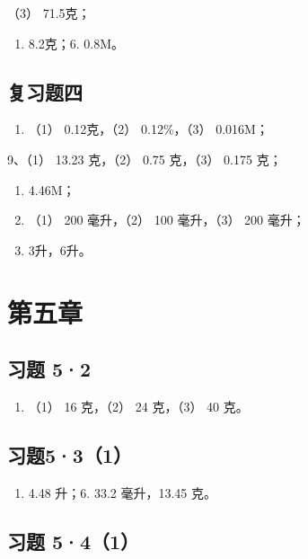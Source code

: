 （3） 71.5克；

\begin{enumerate}[start=4]
\item
  8.2克；6. 0.8M。
\end{enumerate}

\subsection{复习题四}

\begin{enumerate}[start=8]
\item
  （1） 0.12克，（2） 0.12\%，（3） 0.016M；
\end{enumerate}

9、（1） 13.23 克，（2） 0.75 克，（3） 0.175 克；

\begin{enumerate}[start=10]
\item
  4.46M；
\item
  （1） 200 毫升，（2） 100 毫升，（3） 200 毫升；
\item
  3升，6升。
\end{enumerate}

\section{第五章}

\subsection{习题 5·2}

\begin{enumerate}[start=7]
\item
  （1） 16 克，（2） 24 克，（3） 40 克。
\end{enumerate}

\subsection{习题5·3（1）}

\begin{enumerate}[start=5]
\item
  4.48 升；6. 33.2 毫升，13.45 克。
\end{enumerate}

\subsection{习题 5·4（1）}

